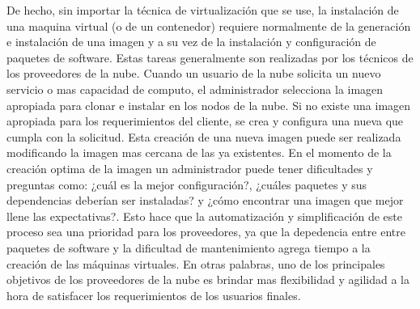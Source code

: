 \documentclass[conference, spanish]{IEEEtran}
\begin{document}
\newpage
De hecho, sin importar la técnica de virtualización que se use, la instalación de una maquina virtual (o de un contenedor) requiere normalmente de la generación e instalación de una imagen y a su vez de la instalación y configuración de paquetes de software. Estas tareas generalmente son realizadas por los técnicos de los proveedores de la nube. Cuando un usuario de la nube solicita un nuevo servicio o mas capacidad de computo, el administrador selecciona la imagen apropiada para clonar e instalar en los nodos de la nube. Si no existe una imagen apropiada para los requerimientos del cliente, se crea y configura una nueva que cumpla con la solicitud. Esta creación de una nueva imagen puede ser realizada modificando la imagen mas cercana de las ya existentes. En el momento de la creación optima de la imagen un administrador puede tener dificultades y preguntas como: ¿cuál es la mejor configuración?, ¿cuáles paquetes y sus dependencias deberían ser instaladas? y ¿cómo encontrar una imagen que mejor llene las expectativas?. Esto hace que la automatización y simplificación de este proceso sea una prioridad para los proveedores, ya que la depedencia entre entre paquetes de software y la dificultad de mantenimiento agrega tiempo a la creación de las máquinas virtuales. En otras palabras, uno de los principales objetivos de los proveedores de la nube es brindar mas flexibilidad y agilidad a la hora de satisfacer los requerimientos de los usuarios finales.\\
\\
\end{document}
